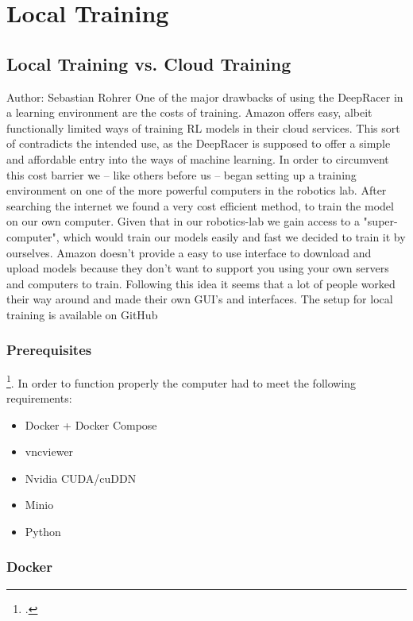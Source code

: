 \chapter{Local Training}

\section{Local Training vs. Cloud Training}
Author: Sebastian Rohrer\newline
One of the major drawbacks of using the DeepRacer in a learning environment are the costs of training. Amazon offers easy, albeit functionally limited ways of training RL models in their cloud services. This sort of contradicts the intended use, as the DeepRacer is supposed to offer a simple and affordable entry into the ways of machine learning.
 In order to circumvent this cost barrier we -- like others before us -- began setting up a training environment on one of the more powerful computers in the robotics lab. After searching the internet we found a very cost efficient method, to train the model on our own computer. Given that in our robotics-lab we gain access to a "super-computer", which would train our models easily and fast we decided to train it by ourselves. Amazon doesn't provide a easy to use interface to download and upload models because they don't want to support you using your own servers and computers to train. Following this idea it seems that a lot of people worked their way around and made their own GUI's and interfaces.
 The setup for local training is available on GitHub 

\subsection{Prerequisites}
\footcite{https://github.com/aws-deepracer-community/deepracer}. In order to function properly the computer had to meet the following requirements:

\begin{itemize}
 \item Docker + Docker Compose
 \item vncviewer 
 \item Nvidia CUDA/cuDDN 
 \item Minio
 \item Python
\end{itemize}

\subsection{Docker}

